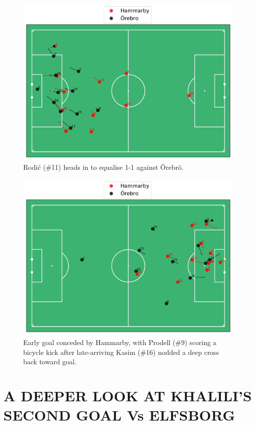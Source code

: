 \documentclass[twocolumn,prl,nobalancelastpage,aps,10pt]{revtex4-1}
\begin{document}
\begin{figure}
\includegraphics*[width=0.75\linewidth,clip]{Orebro_Goal_1_scored}
\caption{Rodi{\'c} (\#11) heads in to equalise 1-1 against {\"O}rebr{\"o}.}
\label{orebro}
\end{figure}

\begin{figure}
\includegraphics*[width=0.75\linewidth,clip]{Orebro_Goal_1_conceded}
\caption{Early goal conceded by Hammarby, with Prodell (\#9) scoring a bicycle kick after late-arriving Kasim (\#16) nodded a deep cross back toward goal.}
\label{orebro_conceded}
\end{figure}

\section{A DEEPER LOOK AT KHALILI'S SECOND GOAL Vs ELFSBORG}
\end{document}
